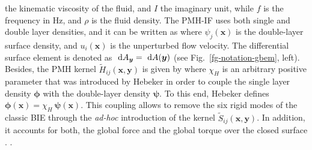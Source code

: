 \documentclass[oneside,onecolumn,10pt,final]{asme2ej}
\newcounter{tema}
\begin{document}
 the kinematic viscosity of the fluid, and $I$
 the imaginary unit, while $f$ is the frequency
in Hz, and $\rho$ is the fluid density.  
%
The PMH-IF uses both single and double layer
densities, and it can be written as \cite{rf:jdelia-gbem2}
%
%
where $\psi_j (\bm{x})$ is the double-layer surface density, 
and $u_i (\bm{x})$ is the unperturbed flow velocity.
%
The differential surface element is denoted
as ${~\mathrm{d}} A_{\bm{y}} = {~\mathrm{d}} A (\bm{y})$ 
(see Fig.~\ref{fg-notation-gbem}, left).
%
%
Besides, the PMH kernel ${\tilde H}_{ij}(\bm{x},\bm{y})$ 
is given by
%
%
where $\chi_H$ is an arbitrary positive parameter that was
introduced by Hebeker \cite{rf:pozrikidis2} in order to couple
the single layer density $\bm {\phi}$ with the double-layer
density $\bm {\psi}$. To this end, Hebeker defines
$\bm {\phi} (\bm {x}) = \chi_H ~ \bm {\psi} (\bm {x})$.
%
This coupling allows to remove the six rigid modes of the
classic BIE through the {\it ad-hoc} introduction of the
kernel ${\tilde S}_{ij} (\bm{x},\bm{y}) $.
%
In addition, it accounts for both, the global
force and the global torque over the closed surface
\cite{rf:power-wrobel,rf:pozrikidis2}.
%
.
\end{document}
